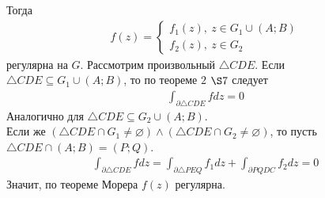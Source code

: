 Тогда
\begin{align*}
  f(z) = \left\{ \begin{matrix}
          f_1(z), \ z \in G_1 \cup (A;B) \\
          f_2(z), \ z \in G_2
      \end{matrix} \right.
\end{align*}
регулярна на $G$.
\pr
Рассмотрим произвольный $\triangle CDE$. Если $\triangle CDE \subseteq G_1 \cup
(A;B)$, то по теореме $2$ $\S7$ следует
\begin{align*}
  \int_{\partial \triangle CDE}f dz = 0
\end{align*}
Аналогично для $\triangle CDE \subseteq G_2 \cup (A;B)$.
\\
Если же $(\triangle CDE \cap G_1 \neq \varnothing)\wedge (\triangle CDE \cap G_2
\neq \varnothing)$,  то пусть $\triangle CDE \cap (A;B)  = (P;Q)$.
\begin{align*}
  \int_{\partial \triangle CDE}f dz =   \int_{\partial \triangle PEQ}f_1 dz +   \int_{\partial PQDC}f_2 dz = 0
\end{align*}
Значит, по теореме Морера $f(z)$ регулярна.
